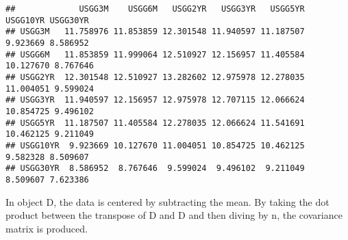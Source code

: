 \documentclass[]{article}
\newenvironment{Shaded}{\begin{snugshade}}{\end{snugshade}}
\newcommand{\KeywordTok}[1]{\textcolor[rgb]{0.13,0.29,0.53}{\textbf{#1}}}
\newcommand{\DecValTok}[1]{\textcolor[rgb]{0.00,0.00,0.81}{#1}}
\newcommand{\OperatorTok}[1]{\textcolor[rgb]{0.81,0.36,0.00}{\textbf{#1}}}
\newcommand{\NormalTok}[1]{#1}
\begin{document}
\begin{Shaded}
\end{Shaded}

\begin{verbatim}
##             USGG3M    USGG6M   USGG2YR   USGG3YR   USGG5YR  USGG10YR USGG30YR
## USGG3M   11.758976 11.853859 12.301548 11.940597 11.187507  9.923669 8.586952
## USGG6M   11.853859 11.999064 12.510927 12.156957 11.405584 10.127670 8.767646
## USGG2YR  12.301548 12.510927 13.282602 12.975978 12.278035 11.004051 9.599024
## USGG3YR  11.940597 12.156957 12.975978 12.707115 12.066624 10.854725 9.496102
## USGG5YR  11.187507 11.405584 12.278035 12.066624 11.541691 10.462125 9.211049
## USGG10YR  9.923669 10.127670 11.004051 10.854725 10.462125  9.582328 8.509607
## USGG30YR  8.586952  8.767646  9.599024  9.496102  9.211049  8.509607 7.623386
\end{verbatim}

In object D, the data is centered by subtracting the mean. By taking the
dot product between the transpose of D and D and then diving by n, the
covariance matrix is produced.
\end{document}

